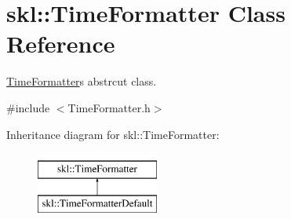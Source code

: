 \hypertarget{classskl_1_1_time_formatter}{}\section{skl\+:\+:Time\+Formatter Class Reference}
\label{classskl_1_1_time_formatter}


\hyperlink{classskl_1_1_time_formatter}{Time\+Formatter}\textquotesingle{}s abstrcut class.  




{\ttfamily \#include $<$Time\+Formatter.\+h$>$}

Inheritance diagram for skl\+:\+:Time\+Formatter\+:\begin{figure}[H]
\begin{center}
\leavevmode
\includegraphics[height=2.000000cm]{classskl_1_1_time_formatter}
\end{center}
\end{figure}
